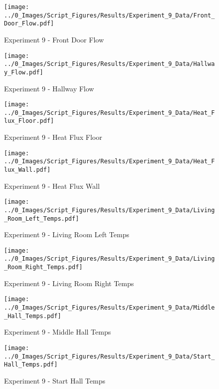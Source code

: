 	\clearpage

	\begin{figure}[H]
		\centering
		\texttt{[image: ../0\_Images/Script\_Figures/Results/Experiment\_9\_Data/Front\_Door\_Flow.pdf]}
		\caption[]{Experiment 9 - Front Door Flow}
	\end{figure}
 

	\begin{figure}[H]
		\centering
		\texttt{[image: ../0\_Images/Script\_Figures/Results/Experiment\_9\_Data/Hallway\_Flow.pdf]}
		\caption[]{Experiment 9 - Hallway Flow}
	\end{figure}
 
	\clearpage

	\begin{figure}[H]
		\centering
		\texttt{[image: ../0\_Images/Script\_Figures/Results/Experiment\_9\_Data/Heat\_Flux\_Floor.pdf]}
		\caption[]{Experiment 9 - Heat Flux Floor}
	\end{figure}
 

	\begin{figure}[H]
		\centering
		\texttt{[image: ../0\_Images/Script\_Figures/Results/Experiment\_9\_Data/Heat\_Flux\_Wall.pdf]}
		\caption[]{Experiment 9 - Heat Flux Wall}
	\end{figure}
 
	\clearpage

	\begin{figure}[H]
		\centering
		\texttt{[image: ../0\_Images/Script\_Figures/Results/Experiment\_9\_Data/Living\_Room\_Left\_Temps.pdf]}
		\caption[]{Experiment 9 - Living Room Left Temps}
	\end{figure}
 

	\begin{figure}[H]
		\centering
		\texttt{[image: ../0\_Images/Script\_Figures/Results/Experiment\_9\_Data/Living\_Room\_Right\_Temps.pdf]}
		\caption[]{Experiment 9 - Living Room Right Temps}
	\end{figure}
 
	\clearpage

	\begin{figure}[H]
		\centering
		\texttt{[image: ../0\_Images/Script\_Figures/Results/Experiment\_9\_Data/Middle\_Hall\_Temps.pdf]}
		\caption[]{Experiment 9 - Middle Hall Temps}
	\end{figure}
 

	\begin{figure}[H]
		\centering
		\texttt{[image: ../0\_Images/Script\_Figures/Results/Experiment\_9\_Data/Start\_Hall\_Temps.pdf]}
		\caption[]{Experiment 9 - Start Hall Temps}
	\end{figure}
 

